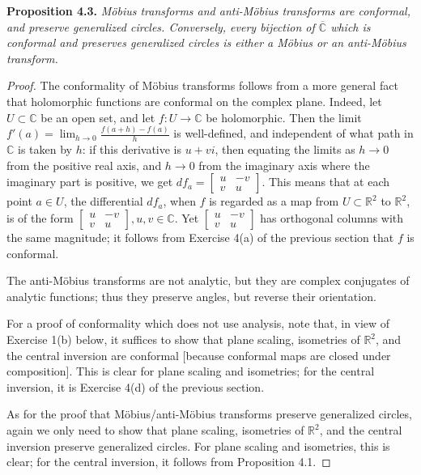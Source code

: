 \documentclass[leqno]{book}
\begin{document}
\noindent\textbf{Proposition 4.3.} \emph{M\"obius transforms and anti-M\"obius transforms are conformal, and preserve generalized circles.  Conversely, every bijection of $\overline{\mathbb C}$ which is conformal and preserves generalized circles is either a M\"obius or an anti-M\"obius transform.}
\begin{proof}
The conformality of M\"obius transforms follows from a more general fact that holomorphic functions are conformal on the complex plane.  Indeed, let $U\subset\mathbb C$ be an open set, and let $f:U\to\mathbb C$ be holomorphic.  Then the limit $f'(a)=\lim_{h\to 0}\frac{f(a+h)-f(a)}h$ is well-defined, and independent of what path in $\mathbb C$ is taken by $h$: if this derivative is $u+vi$, then equating the limits as $h\to 0$ from the positive real axis, and $h\to 0$ from the imaginary axis where the imaginary part is positive, we get $df_a=\begin{bmatrix}u&-v\\v&u\end{bmatrix}$.  This means that at each point $a\in U$, the differential $df_a$, when $f$ is regarded as a map from $U\subset\mathbb R^2$ to $\mathbb R^2$, is of the form $\begin{bmatrix}u&-v\\v&u\end{bmatrix},u,v\in\mathbb C$.  Yet $\begin{bmatrix}u&-v\\v&u\end{bmatrix}$ has orthogonal columns with the same magnitude; it follows from Exercise 4(a) of the previous section that $f$ is conformal.

The anti-M\"obius transforms are not analytic, but they are complex conjugates of analytic functions; thus they preserve angles, but reverse their orientation.

For a proof of conformality which does not use analysis, note that, in view of Exercise 1(b) below, it suffices to show that plane scaling, isometries of $\mathbb R^2$, and the central inversion are conformal [because conformal maps are closed under composition].  This is clear for plane scaling and isometries; for the central inversion, it is Exercise 4(d) of the previous section.

As for the proof that M\"obius/anti-M\"obius transforms preserve generalized circles, again we only need to show that plane scaling, isometries of $\mathbb R^2$, and the central inversion preserve generalized circles.  For plane scaling and isometries, this is clear; for the central inversion, it follows from Proposition 4.1.


\end{proof}
\end{document}
